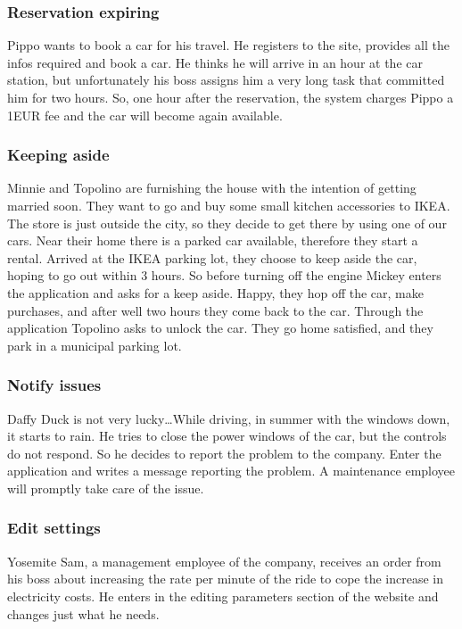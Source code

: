 \documentclass{scrreprt}
\begin{document}
\subsubsection{Reservation expiring}
Pippo wants to book a car for his travel. He registers to the site, provides all the infos required and book a car. He thinks he will arrive in an hour at the car station, but unfortunately his boss assigns him a very long task that committed him for two hours. So, one hour after the reservation, the system charges Pippo a 1EUR fee and the car will become again available.

\subsubsection{Keeping aside}
Minnie and Topolino are furnishing the house with the intention of getting married soon.
They want to go and buy some small kitchen accessories to IKEA. The store is just outside the city, so they decide to get there by using one of our cars.
Near their home there is a parked car available, therefore they start a rental.
Arrived at the IKEA parking lot, they choose to keep aside the car, hoping to go out within 3 hours. So before turning off the engine Mickey enters the application and asks for a keep aside.
Happy, they hop off the car, make purchases, and after well two hours they come back to the car. Through the application Topolino asks to unlock the car. They go home satisfied, and they park in a municipal parking lot.

\subsubsection{Notify issues}
Daffy Duck is not very lucky\dots While driving, in summer with the windows down, it starts to rain. He tries to close the power windows of the car, but the controls do not respond. So he decides to report the problem to the company. Enter the application and writes a message reporting the problem. A maintenance employee will promptly take care of the issue.

\subsubsection{Edit settings}
Yosemite Sam, a management employee of the company, receives an order from his boss about increasing the rate per minute of the ride to cope the increase in electricity costs. He enters in the editing parameters section of the website and changes just what he needs.
\end{document}
